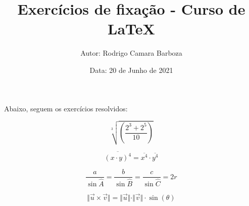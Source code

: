 \documentclass[a4paper, 12pt]{article}
\title{\textbf{Exercícios de fixação - Curso de LaTeX}}
\author{Autor: Rodrigo Camara Barboza}
\date{Data: 20 de Junho de 2021}
\begin{document}
\maketitle

Abaixo, seguem os exercícios resolvidos:

\begin{equation}
\sqrt[3]{\left( \frac{2^{3} + 2^{5}}{10}\right)}
\end{equation}

\begin{equation}
\overline{(x \cdot y)^{4}} = \overline{x^{4}} \cdot \overline{y^{4}}
\end{equation}

\begin{equation}
\frac{a}{\sin\widehat{A}} = \frac{b}{\sin\widehat{B}} = \frac{c}{\sin\widehat{C}} = 2r
\end{equation}

\begin{equation}
\Vert \vec{u} \times \vec{v} \Vert = \Vert \vec{u} \Vert \cdot \Vert \vec{v} \Vert \cdot \sin(\theta)
\end{equation}
\end{document}
